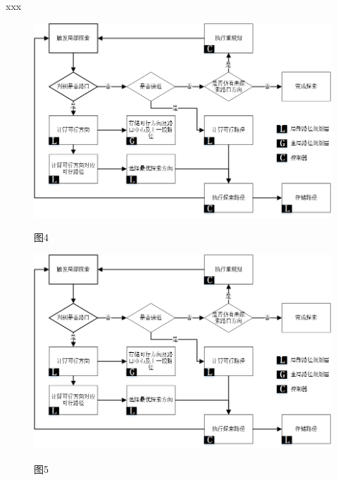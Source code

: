 \documentclass[hyperref]{ctexart}
\begin{document}
	
	xxx
	\thispagestyle{empty}
	\clearpage
	\setcounter{page}{6}	
	
	\begin{figure}[htbp]
		\qquad		\qquad	\qquad	\qquad	\qquad		\includegraphics[width=0.6\linewidth]{graph/structure.png}
		\begin{center}
			图4
		\end{center}
		\label{fig:04}
		\begin{center}
			\quad	\includegraphics[width=0.6\linewidth]{graph/structure.png}
			\begin{center}图5\end{center}
		\label{fig:05}
		\end{center}
	\end{figure}
	



	
	
	
	
	
	
	
	
	
	
	
	
\end{document}

